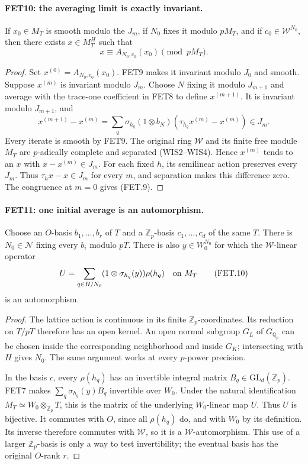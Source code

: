 \paragraph{FET10: the averaging limit is exactly invariant.}
\label{claim:FET10}
If $x_0\in M_T$ is smooth modulo the $J_m$, if $N_0$ fixes
it modulo $pM_T$, and if $c_0\in\mathcal W^{N_0}$, then there
exists $x\in M_T^H$ such that
\[
                   x\equiv A_{N_0,c_0}(x_0)\pmod {pM_T}.
                                                               \tag{FET.9}
\]

\begin{proof}
Set $x^{(0)}=A_{N_0,c_0}(x_0)$. FET9 makes it invariant
modulo $J_0$ and smooth. Suppose $x^{(m)}$ is invariant modulo
$J_m$. Choose $N$ fixing it modulo $J_{m+1}$ and average
with the trace-one coefficient in FET8 to define $x^{(m+1)}$.
It is invariant modulo $J_{m+1}$, and
\[
 x^{(m+1)}-x^{(m)}
 =\sum_q\sigma_{h_q}(1\otimes b_N)
                       (\tau_{h_q}x^{(m)}-x^{(m)})\in J_m.
\]
Every iterate is smooth by FET9. The original ring $\mathcal W$
and its finite free module $M_T$ are $p$-adically complete and
separated (WIS2--WIS4). Hence $x^{(m)}$ tends to an $x$ with
$x-x^{(m)}\in J_m$. For each fixed $h$, its semilinear action
preserves every $J_m$. Thus $\tau_hx-x\in J_m$ for every $m$,
and separation makes this difference zero. The congruence at
$m=0$ gives (FET.9).
\end{proof}

\paragraph{FET11: one initial average is an automorphism.}
\label{claim:FET11}
Choose an $O$-basis $b_1,\ldots,b_r$ of $T$ and a
$\mathbb Z_p$-basis $c_1,\ldots,c_d$ of the same $T$.
There is $N_0\in\mathcal N$ fixing every $b_i$ modulo $pT$.
There is also $y\in W_0^{N_0}$ for which the $\mathcal W$-linear
operator
\[
 U=\sum_{q\in H/N_0}(1\otimes\sigma_{h_q}(y))\rho(h_q)
                         \quad\hbox{on }M_T               \tag{FET.10}
\]
is an automorphism.

\begin{proof}
The lattice action is continuous in its finite
$\mathbb Z_p$-coordinates. Its reduction on $T/pT$ therefore
has an open kernel. An open normal subgroup $G_L$ of
$G_{\mathbb Q_p}$ can be chosen inside the corresponding
neighborhood and inside $G_K$; intersecting with $H$ gives
$N_0$. The same argument works at every $p$-power precision.

In the basis $c$, every $\rho(h_q)$ has an invertible integral
matrix $B_q\in\mathrm{GL}_d(\mathbb Z_p)$. FET7 makes
$\sum_q\sigma_{h_q}(y)B_q$ invertible over $W_0$.
Under the natural identification
$M_T\simeq W_0\otimes_{\mathbb Z_p}T$, this is the matrix of
the underlying $W_0$-linear map $U$. Thus $U$ is bijective.
It commutes with $O$, since all $\rho(h_q)$ do, and with
$W_0$ by its definition. Its inverse therefore commutes with
$\mathcal W$, so it is a $\mathcal W$-automorphism.
This use of a larger $\mathbb Z_p$-basis is only a way to test
invertibility; the eventual basis has the original $O$-rank $r$.
\end{proof}

